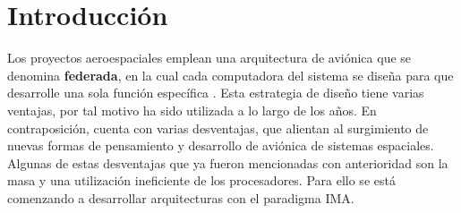 \section{Introducción}
Los proyectos aeroespaciales emplean una arquitectura de aviónica que se denomina \textbf{federada}, en la cual cada computadora del sistema se diseña para que desarrolle una sola función específica \citep{Loveless15}. Esta estrategia de diseño tiene varias ventajas, por tal motivo ha sido utilizada a lo largo de los años. En contraposición, cuenta con varias desventajas, que alientan al surgimiento de nuevas formas de pensamiento y desarrollo de aviónica de sistemas espaciales. Algunas de estas desventajas que ya fueron mencionadas con anterioridad son la masa y una utilización ineficiente de los procesadores. Para ello se está comenzando a desarrollar arquitecturas con el paradigma IMA.
